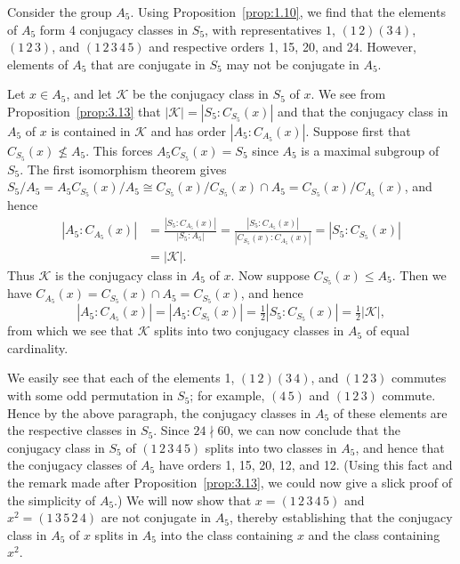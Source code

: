 \documentclass[../Odyssey_Project.tex]{subfiles}
\begin{document}
\begin{example}
\label{ex:15.eg.9}
Consider the group $A_5$. Using Proposition~\ref{prop:1.10}, we find that the elements of $A_5$ form 4 conjugacy classes in $S_5$, with representatives $1$, $(1\,2)(3\,4)$, $(1\,2\,3)$, and $(1\,2\,3\,4\,5)$ and respective orders 1, 15, 20, and 24. However, elements of $A_5$ that are conjugate in $S_5$ may not be conjugate in $A_5$.

Let $x \in A_5$, and let $\mathcal{K}$ be the conjugacy class in $S_5$ of $x$. We see from Proposition~\ref{prop:3.13} that $|\mathcal{K}| = |S_5 : C_{S_5}(x)|$ and that the conjugacy class in $A_5$ of $x$ is contained in $\mathcal{K}$ and has order $|A_5 : C_{A_5}(x)|$. Suppose first that $C_{S_5}(x) \not\leq A_5$. This forces $A_5 C_{S_5}(x) = S_5$ since $A_5$ is a maximal subgroup of $S_5$. The first isomorphism theorem gives $S_5/A_5 = A_5 C_{S_5}(x)/A_5 \cong C_{S_5}(x)/C_{S_5}(x) \cap A_5 = C_{S_5}(x)/C_{A_5}(x)$, and hence
\begin{align*}
    |A_5 : C_{A_5}(x)| &= \frac{|S_5 : C_{A_5}(x)|}{|S_5 : A_5|} = \frac{|S_5 : C_{A_5}(x)|}{|C_{S_5}(x) : C_{A_5}(x)|} = |S_5 : C_{S_5}(x)| \\
    &= |\mathcal{K}|.
\end{align*}
Thus $\mathcal{K}$ is the conjugacy class in $A_5$ of $x$. Now suppose $C_{S_5}(x) \leq A_5$. Then we have $C_{A_5}(x) = C_{S_5}(x) \cap A_5 = C_{S_5}(x)$, and hence
\[
    |A_5 : C_{A_5}(x)| = |A_5 : C_{S_5}(x)| = \tfrac{1}{2}|S_5 : C_{S_5}(x)| = \tfrac{1}{2}|\mathcal{K}|,
\]
from which we see that $\mathcal{K}$ splits into two conjugacy classes in $A_5$ of equal cardinality.

We easily see that each of the elements 1, $(1\,2)(3\,4)$, and $(1\,2\,3)$ commutes with some odd permutation in $S_5$; for example, $(4\,5)$ and $(1\,2\,3)$ commute. Hence by the above paragraph, the conjugacy classes in $A_5$ of these elements are the respective classes in $S_5$. Since $24 \nmid 60$, we can now conclude that the conjugacy class in $S_5$ of $(1\,2\,3\,4\,5)$ splits into two classes in $A_5$, and hence that the conjugacy classes of $A_5$ have orders 1, 15, 20, 12, and 12. (Using this fact and the remark made after Proposition~\ref{prop:3.13}, we could now give a slick proof of the simplicity of $A_5$.) We will now show that $x = (1\,2\,3\,4\,5)$ and $x^2 = (1\,3\,5\,2\,4)$ are not conjugate in $A_5$, thereby establishing that the conjugacy class in $A_5$ of $x$ splits in $A_5$ into the class containing $x$ and the class containing $x^2$.


\end{example}
\end{document}

